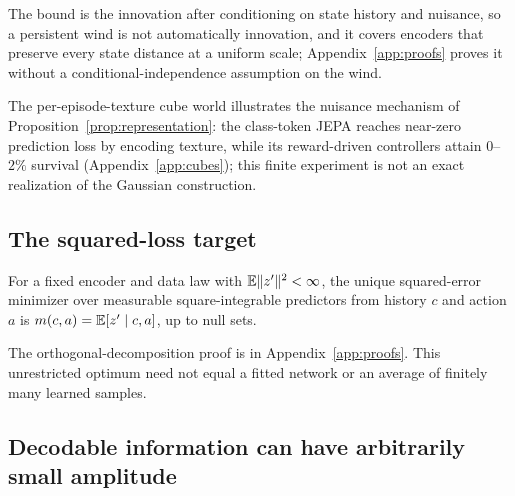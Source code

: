 The bound is the innovation after conditioning on state history and nuisance, so a persistent wind is
not automatically innovation, and it covers encoders that preserve every state distance at a uniform
scale; Appendix~\ref{app:proofs} proves it without a conditional-independence assumption on the wind.

The per-episode-texture cube world illustrates the nuisance mechanism of
Proposition~\ref{prop:representation}: the class-token JEPA reaches near-zero prediction loss
by encoding texture, while its reward-driven controllers attain $0$--$2\%$ survival
(Appendix~\ref{app:cubes}); this finite experiment is not an exact realization of the Gaussian construction.

\subsection{The squared-loss target}
\begin{lemma}
\label{lem:mean}
For a fixed encoder and data law with $\mathbb{E}\|z'\|^2<\infty$, the unique squared-error minimizer
over measurable square-integrable predictors from history $c$ and action $a$ is
$m(c,a)=\mathbb{E}[z'\mid c,a]$, up to null sets.
\end{lemma}
The orthogonal-decomposition proof is in Appendix~\ref{app:proofs}. This unrestricted optimum
need not equal a fitted network or an average of finitely many learned samples.

\subsection{Decodable information can have arbitrarily small amplitude}
\label{sec:amplitude}

